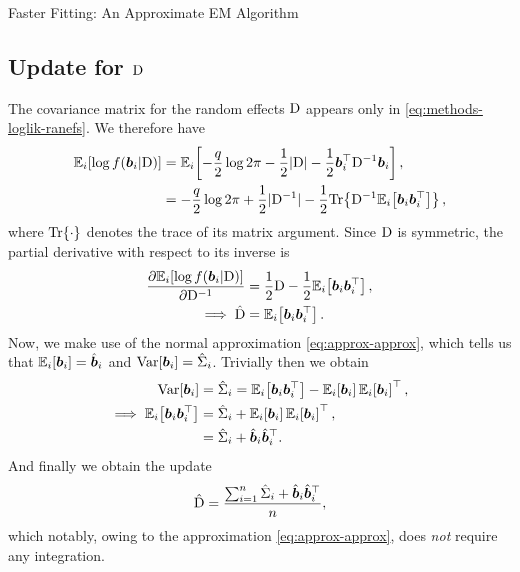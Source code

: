 \begin{chapter}{\label{cha:approx}Faster Fitting: An Approximate EM Algorithm}
  \subsection{Update for \texorpdfstring{$\mathrm{D}$}{D}}\label{sec:approx-Mstep-D}
  The covariance matrix for the random effects $\mathrm{D}$ appears only in \eqref{eq:methods-loglik-ranefs}. We therefore have
  \begin{align*}
      \mathbb{E}_i\!\left[\log f\!\left(\bm{b}_i|\mathrm{D}\right)\right]&=\mathbb{E}_i\!\left[-\frac{q}{2}\log2\pi-\frac{1}{2}|\mathrm{D}|-\frac{1}{2}\bm{b}_i^\top\mathrm{D}^{-1}\bm{b}_i\right],\\
      &=-\frac{q}{2}\log2\pi+\frac{1}{2}|\mathrm{D}^{-1}|-\frac{1}{2}\mathrm{Tr}\!\left\{\mathrm{D}^{-1}\mathbb{E}_i\!\left[\bm{b}_i\bm{b}_i^\top\right]\right\},
  \end{align*}
  where $\mathrm{Tr}\!\left\{\cdot\right\}$ denotes the trace of its matrix argument. Since $\mathrm{D}$ is symmetric, the partial derivative with respect to its inverse is
  \begin{align*}
      \frac{\partial\mathbb{E}_i\!\left[\log f\!\left(\bm{b}_i|\mathrm{D}\right)\right]}{\partial\mathrm{D}^{-1}}&=\frac{1}{2}\mathrm{D}-\frac{1}{2}\mathbb{E}_i\!\left[\bm{b}_i\bm{b}_i^\top\right],\\
      \implies \hat{\mathrm{D}}&=\mathbb{E}_i\!\left[\bm{b}_i\bm{b}_i^\top\right].
  \end{align*}
  Now, we make use of the normal approximation \eqref{eq:approx-approx}, which tells us that $\operatorname{\mathbb{E}}_i\!\left[\bm{b}_i\right]=\hat{\bm{b}}_i$ and $\mathrm{Var}\!\left[\bm{b}_i\right]=\hat{\Sigma}_i$. Trivially then we obtain
  \begin{align*}
      \mathrm{Var}\!\left[\bm{b}_i\right]&=\hat{\Sigma}_i=\mathbb{E}_i\!\left[\bm{b}_i\bm{b}_i^\top\right]-\mathbb{E}_i\!\left[\bm{b}_i\right]\mathbb{E}_i\!\left[\bm{b}_i\right]^\top,\\
      \implies\mathbb{E}_i\!\left[\bm{b}_i\bm{b}_i^\top\right]&=\hat{\Sigma}_i+\mathbb{E}_i\!\left[\bm{b}_i\right]\mathbb{E}_i\!\left[\bm{b}_i\right]^\top,\\
      &=\hat{\Sigma}_i+\hat{\bm{b}}_i\hat{\bm{b}}_i^\top.
  \end{align*}
  And finally we obtain the update
  \begin{align}
      \hat{\mathrm{D}}=\frac{\sum_{i=1}^n\hat{\Sigma}_i+\hat{\bm{b}}_i\hat{\bm{b}}_i^\top}{n},
  \label{eq:approx-Mstep-D}
  \end{align}
  which notably, owing to the approximation \eqref{eq:approx-approx}, does \textit{not} require any integration.


\end{chapter}
